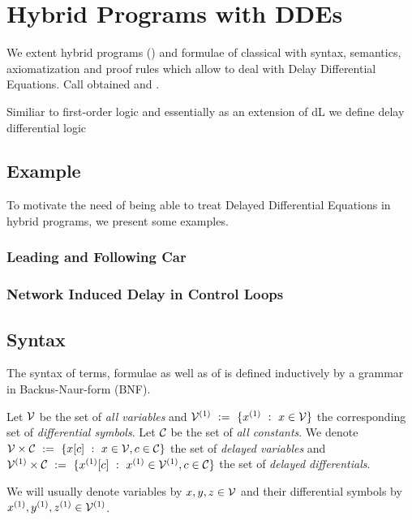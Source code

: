 \chapter{Hybrid Programs with DDEs}\label{hybrid-programs-with-ddes}

We extent hybrid programs (\HPs) and formulae of classical \dL with syntax, semantics, axiomatization and proof rules which allow to deal with Delay Differential Equations.
Call obtained \dHPs and \ddL.

Similiar to first-order logic and essentially as an extension of dL we define delay differential logic

\cite{Platzer12Complete,Platzer15Uniform}

\section{Example}
    \label{example-hp-cars}
    To motivate the need of being able to treat Delayed Differential Equations in hybrid programs, we present some examples.

    \subsection{Leading and Following Car}

    \subsection{Network Induced Delay in Control Loops}

\section{Syntax}
    \label{sec:syntax}

    The syntax of \ddL terms, formulae as well as of \dHPs is defined inductively by a grammar in Backus-Naur-form (BNF).

    Let $\mathcal{V}$ be the set of \emph{all variables} and $\diffvars\defeq\{\D{x} \with x\in\allvars\}$ the corresponding set of \emph{differential symbols}.
    Let $\mathcal{C}_{}$ be the set of \emph{all constants}. We denote $\mathcal{V}\times\mathcal{C}_{}~\mathrel{\mathop{:}}=~\{x[c] ~\mathrel{\mathop{:}}~ x\in\mathcal{V}, c\in\mathcal{C}_{}\}$ the set of \emph{delayed variables} and $\delaydiffvars\defeq\{\Dxtau[c] \with \D{x}\in\diffvars, c\in\constants\}$ the set of \emph{delayed differentials}.

    We will usually denote variables by $x,y,z\in\mathcal{V}$ and their differential symbols by $\D{x},\D{y},\D{z}\in\diffvars$.

